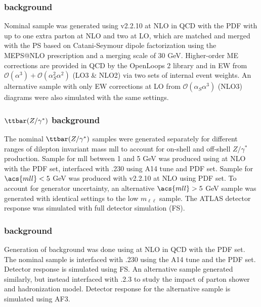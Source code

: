 \documentclass[../thesis.tex]{subfiles}
\begin{document}
\subsubsection*{\ttW background}
Nominal \ttW sample was generated using \sherpa v2.2.10 \citep{Bothmann:2019yzt} at \acs{NLO} in \acs{QCD} with the \nnpdfnnlo \citep{Ball:2014uwa} \acs{PDF} with up to one extra parton at \acs{NLO} and two at \acs{LO}, which are matched and merged with the \sherpa \acs{PS} based on Catani-Seymour dipole factorization \citep{Schumann:2007mg} using the MEPS@NLO prescription \citep{Hoeche:2011fd, Hoeche:2012yf, Catani:2001cc, Hoeche:2009rj} and a merging scale of 30 GeV. Higher-order \acs{ME} corrections are provided in \acs{QCD} by the OpenLoops 2 library \citep{Cascioli:2011va, Denner:2016kdg, Buccioni:2019sur} and in \acs{EW} from $\mathcal{O}(\alpha^3)+\mathcal{O}(\alpha^2_S\alpha^2)$ (LO3 \& NLO2) via two sets of internal event weights. An alternative sample with only \acs{EW} corrections at \acs{LO} from $\mathcal{O}(\alpha_S\alpha^3)$ (NLO3) diagrams were also simulated with the same settings.
\subsubsection*{$\ttbar(Z/\gamma^*)$ background}
The nominal $\ttbar(Z/\gamma^*)$ samples were generated separately for different ranges of dilepton invariant mass \acs{mll} to account for on-shell and off-shell $Z/\gamma^*$ production. Sample for \acs{mll} between 1 and 5 GeV was produced using \mgamc \citep{Alwall:2014hca} at \acs{NLO} with the \nnpdfnlo \citep{Ball:2014uwa} \acs{PDF} set, interfaced with \pythia.230 \citep{Sjostrand:2014zea} using A14 tune \citep{ATL-PHYS-PUB-2014-021} and \nnpdftwo \acs{PDF} set. Sample for $\acs{mll} < 5$ GeV was produced with \sherpa v2.2.10 \citep{Bothmann:2019yzt} at \acs{NLO} using \nnpdfnnlo \acs{PDF} set. To account for generator uncertainty, an alternative $\acs{mll}>5$ GeV sample was generated with identical settings to the low $m_{\ell\ell}$ sample. The ATLAS detector response was simulated with full detector simulation (\acs{FS}).
\subsubsection*{\ttH background}
Generation of \ttH background was done using \powhegbox \citep{Frixione:2007nw, Nason:2004rx,Frixione:2007vw, Alioli:2010xd} at \acs{NLO} in \acs{QCD} with the \nnpdfnlo \acs{PDF} \citep{Ball:2014uwa} set. The nominal sample is interfaced with \pythia.230 \citep{Sjostrand:2014zea} using the A14 tune \citep{ATL-PHYS-PUB-2014-021} and the \nnpdftwo \citep{Ball:2012cx} \acs{PDF} set. Detector response is simulated using \acs{FS}. An alternative \ttH sample generated similarly, but instead interfaced with \herwigseven.2.3 \citep{Bahr:2008pv, Bellm:2015jjp} to study the impact of parton shower and hadronization model. Detector response for the alternative sample is simulated using \acs{AF3}.
\end{document}

